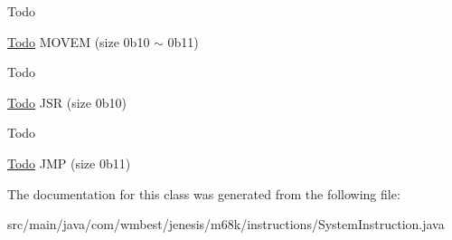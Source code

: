 \begin{DoxyRefDesc}{Todo}
\item[\hyperlink{todo__todo000047}{Todo}]M\-O\-V\-E\-M (size 0b10 $\sim$ 0b11) \end{DoxyRefDesc}


\begin{DoxyRefDesc}{Todo}
\item[\hyperlink{todo__todo000048}{Todo}]J\-S\-R (size 0b10) \end{DoxyRefDesc}


\begin{DoxyRefDesc}{Todo}
\item[\hyperlink{todo__todo000049}{Todo}]J\-M\-P (size 0b11) \end{DoxyRefDesc}


The documentation for this class was generated from the following file\-:\begin{DoxyCompactItemize}
\item 
src/main/java/com/wmbest/jenesis/m68k/instructions/System\-Instruction.\-java\end{DoxyCompactItemize}
